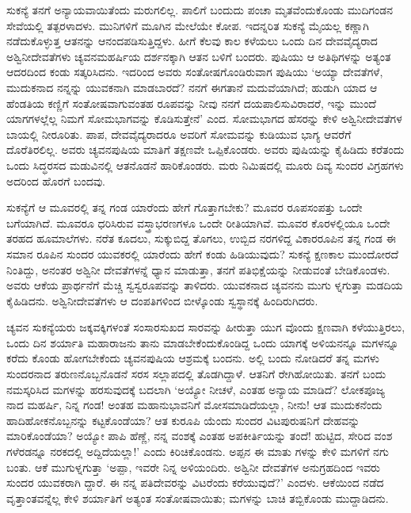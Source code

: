 ಸುಕನ್ಯೆ ತನಗೆ ಅನ್ಯಾಯವಾಯಿತೆಂದು ಮರುಗಲಿಲ್ಲ. ಪಾಲಿಗೆ ಬಂದುದು ಪಂಚಾ ಮೃತವೆಂದುಕೊಂಡು ಮುದಿಗಂಡನ ಸೇವೆಯಲ್ಲಿ ತತ್ಪರಳಾದಳು. ಮುನಿಗಳಿಗೆ ಮೂಗಿನ ಮೇಲೆಯೇ ಕೋಪ. ಇದನ್ನರಿತ ಸುಕನ್ಯೆ ಮೈಯಲ್ಲ ಕಣ್ಣಾಗಿ ನಡೆದುಕೊಳ್ಳುತ್ತ ಆತನನ್ನು ಆನಂದಪಡಿಸುತ್ತಿದ್ದಳು. ಹೀಗೆ ಕೆಲವು ಕಾಲ ಕಳೆಯಲು ಒಂದು ದಿನ ದೇವವೈದ್ಯರಾದ ಅಶ್ವಿನೀದೇವತೆಗಳು ಚ್ಯವನಮಹರ್ಷಿಯ ದರ್ಶನಕ್ಕಾಗಿ ಆತನ ಬಳಿಗೆ ಬಂದರು. ಪುಷಿಯು ಆ ಅತಿಥಿಗಳನ್ನು ಅತ್ಯಂತ ಆದರದಿಂದ ಕಂಡು ಸತ್ಕರಿಸಿದನು. ಇದರಿಂದ ಅವರು ಸಂತೋಷಗೊಂಡಿರುವಾಗ ಪುಷಿಯು ‘ಅಯ್ಯಾ ದೇವತೆಗಳೆ, ಮುದುಕನಾದ ನನ್ನನ್ನು ಯುವಕನಾಗಿ ಮಾಡಬಾರದೆ? ನನಗೆ ಈಗತಾನೆ ಮದುವೆಯಾಗಿದೆ; ಹುಡುಗಿ ಯಾದ ಆ ಹೆಂಡತಿಯ ಕಣ್ಣಿಗೆ ಸಂತೋಷವಾಗುವಂತಹ ರೂಪವನ್ನು ನೀವು ನನಗೆ ದಯಪಾಲಿಸುವಿರಾದರೆ, ಇನ್ನು ಮುಂದೆ ಯಾಗಗಳಲ್ಲೆಲ್ಲ ನಿಮಗೆ ಸೋಮಭಾಗವನ್ನು ಕೊಡಿಸುತ್ತೇನೆ’ ಎಂದ. ಸೋಮಭಾಗದ ಹೆಸರನ್ನು ಕೇಳಿ ಅಶ್ವಿನೀದೇವತೆಗಳ ಬಾಯಲ್ಲಿ ನೀರೂರಿತು. ಪಾಪ, ದೇವವೈದ್ಯರಾದರೂ ಅವರಿಗೆ ಸೋಮವನ್ನು ಕುಡಿಯುವ ಭಾಗ್ಯ ಆವರೆಗೆ ದೊರೆತಿರಲಿಲ್ಲ. ಅವರು ಚ್ಯವನಪುಷಿಯ ಮಾತಿಗೆ ತಕ್ಷಣವೇ ಒಪ್ಪಿಕೊಂಡರು. ಅವರು ಪುಷಿಯನ್ನು ಕೈಹಿಡಿದು ಕರೆತಂದು ಒಂದು ಸಿದ್ಧರಸದ ಮಡುವಿನಲ್ಲಿ ಆತನೊಡನೆ ಹಾರಿಕೊಂಡರು. ಮರು ನಿಮಿಷದಲ್ಲಿ ಮೂರು ದಿವ್ಯ ಸುಂದರ ವಿಗ್ರಹಗಳು ಅದರಿಂದ ಹೊರಗೆ ಬಂದವು.

ಸುಕನ್ಯೆಗೆ ಆ ಮೂವರಲ್ಲಿ ತನ್ನ ಗಂಡ ಯಾರೆಂದು ಹೇಗೆ ಗೊತ್ತಾಗಬೇಕು? ಮೂವರ ರೂಪಸಂಪತ್ತು ಒಂದೇ ಬಗೆಯಾಗಿದೆ. ಮೂವರೂ ಧರಿಸಿರುವ ವಸ್ತ್ರಾಭರಣಗಳೂ ಒಂದೇ ರೀತಿಯಾಗಿವೆ. ಮೂವರ ಕೊರಳಲ್ಲಿಯೂ ಒಂದೇ ತರಹದ ಹೂಮಾಲೆಗಳು. ನರೆತ ಕೂದಲು, ಸುಕ್ಕುಬಿದ್ದ ತೊಗಲು, ಉಬ್ಬಿದ ನರಗಳಿದ್ದ ವಿಕಾರರೂಪಿನ ತನ್ನ ಗಂಡ ಈ ಸಮಾನ ರೂಪಿನ ಸುಂದರ ಯುವಕರಲ್ಲಿ ಯಾರೆಂದು ಹೇಗೆ ಕಂಡು ಹಿಡಿಯುವುದು? ಸುಕನ್ಯೆ ಕ್ಷಣಕಾಲ ಮುಂದೋರದೆ ನಿಂತಿದ್ದು, ಅನಂತರ ಅಶ್ವಿನೀ ದೇವತೆಗಳನ್ನೆ ಧ್ಯಾನ ಮಾಡುತ್ತಾ, ತನಗೆ ಪತಿಭಿಕ್ಷೆಯನ್ನು ನೀಡುವಂತೆ ಬೇಡಿಕೊಂಡಳು. ಅವರು ಆಕೆಯ ಪ್ರಾರ್ಥನೆಗೆ ಮೆಚ್ಚಿ ಸ್ವಸ್ವರೂಪವನ್ನು ತಾಳಿದರು. ಯುವಕನಾದ ಚ್ಯವನನು ಮುಗು ಳ್ನಗುತ್ತಾ ಮಡದಿಯ ಕೈಹಿಡಿದನು. ಅಶ್ವಿನೀದೇವತೆಗಳು ಆ ದಂಪತಿಗಳಿಂದ ಬೀಳ್ಕೊಂಡು ಸ್ವಸ್ಥಾನಕ್ಕೆ ಹಿಂದಿರುಗಿದರು.

ಚ್ಯವನ ಸುಕನ್ಯೆಯರು ಜಕ್ಕವಕ್ಕಿಗಳಂತೆ ಸಂಸಾರಸುಖದ ಸಾರವನ್ನು ಹೀರುತ್ತಾ ಯುಗ ವೊಂದು ಕ್ಷಣವಾಗಿ ಕಳೆಯುತ್ತಿರಲು, ಒಂದು ದಿನ ಶರ್ಯಾತಿ ಮಹಾರಾಜನು ತಾನು ಮಾಡಬೇಕೆಂದುಕೊಂಡಿದ್ದ ಒಂದು ಯಾಗಕ್ಕೆ ಅಳಿಯನನ್ನೂ ಮಗಳನ್ನೂ ಕರೆದು ಕೊಂಡು ಹೋಗಬೇಕೆಂದು ಚ್ಯವನಪುಷಿಯ ಆಶ್ರಮಕ್ಕೆ ಬಂದನು. ಅಲ್ಲಿ ಬಂದು ನೋಡಿದರೆ ತನ್ನ ಮಗಳು ಸುಂದರನಾದ ತರುಣನೊಬ್ಬನೊಡನೆ ಸರಸ ಸಲ್ಲಾಪದಲ್ಲಿ ತೊಡಗಿದ್ದಾಳೆ. ಆತನಿಗೆ ರೇಗಿಹೋಯಿತು. ತನಗೆ ಬಂದು ನಮಸ್ಕರಿಸಿದ ಮಗಳನ್ನು ಹರಸುವುದಕ್ಕೆ ಬದಲಾಗಿ ‘ಅಯ್ಯೋ ನೀಚಳೆ, ಎಂತಹ ಅನ್ಯಾಯ ಮಾಡಿದೆ? ಲೋಕಪೂಜ್ಯ ನಾದ ಮಹರ್ಷಿ, ನಿನ್ನ ಗಂಡ! ಅಂತಹ ಮಹಾನುಭಾವನಿಗೆ ಮೋಸಮಾಡಿದೆಯಲ್ಲಾ, ನೀನು! ಆತ ಮುದುಕನೆಂದು ಹಾದಿಹೋಕನೊಬ್ಬನನ್ನು ಕಟ್ಟಕೊಂಡೆಯಾ? ಆತ ಕುರೂಪಿ ಯೆಂದು ಸುಂದರ ವಿಟಪುರುಷನಿಗೆ ದೇಹವನ್ನು ಮಾರಿಕೊಂಡೆಯಾ? ಅಯ್ಯೋ ಪಾಪಿ ಹೆಣ್ಣೆ, ನನ್ನ ವಂಶಕ್ಕೆ ಎಂತಹ ಅಪಕೀರ್ತಿಯನ್ನು ತಂದೆ! ಹುಟ್ಟಿದ, ಸೇರಿದ ವಂಶ ಗಳೆರಡನ್ನೂ ನರಕದಲ್ಲಿ ಅದ್ದಿದೆಯಲ್ಲಾ!’ ಎಂದು ಕಿರಿಚಿಕೊಂಡನು. ಅಪ್ಪನ ಈ ಮಾತು ಗಳನ್ನು ಕೇಳಿ ಮಗಳಿಗೆ ನಗು ಬಂತು. ಆಕೆ ಮುಗುಳ್ನಗುತ್ತಾ ‘ಅಪ್ಪಾ, ಇವರೇ ನಿನ್ನ ಅಳಿಯಂದಿರು. ಅಶ್ವಿನೀ ದೇವತೆಗಳ ಅನುಗ್ರಹದಿಂದ ಇವರು ಸುಂದರ ಯುವಕರಾಗಿ ದ್ದಾರೆ. ಈ ನನ್ನ ಪತಿದೇವರನ್ನು ವಿಟರೆಂದು ಕರೆಯುವುದೆ?’ ಎಂದಳು. ಆಕೆಯಿಂದ ನಡೆದ ವೃತ್ತಾಂತವನ್ನೆಲ್ಲ ಕೇಳಿ ಶರ್ಯಾತಿಗೆ ಅತ್ಯಂತ ಸಂತೋಷವಾಯಿತು; ಮಗಳನ್ನು ಬಾಚಿ ತಬ್ಬಿಕೊಂಡು ಮುದ್ದಾಡಿದನು.

